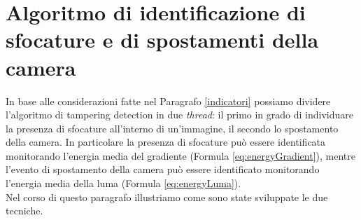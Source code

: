 \section{Algoritmo di identificazione di sfocature e di spostamenti della camera}
\label{monitoraggio}
In base alle considerazioni fatte nel Paragrafo \ref{indicatori} possiamo dividere l'algoritmo di tampering detection in due \textit{thread}:
il primo in grado di individuare la presenza di sfocature all'interno di un'immagine, il secondo lo spostamento della camera.
In particolare la presenza di sfocature pu\`o essere identificata monitorando l'energia media del gradiente (Formula \eqref{eq:energyGradient}), mentre l'evento di spostamento della camera pu\`o essere identificato monitorando l'energia media della luma (Formula \eqref{eq:energyLuma}).\\
Nel corso di questo paragrafo illustriamo come sono state sviluppate le due tecniche.
